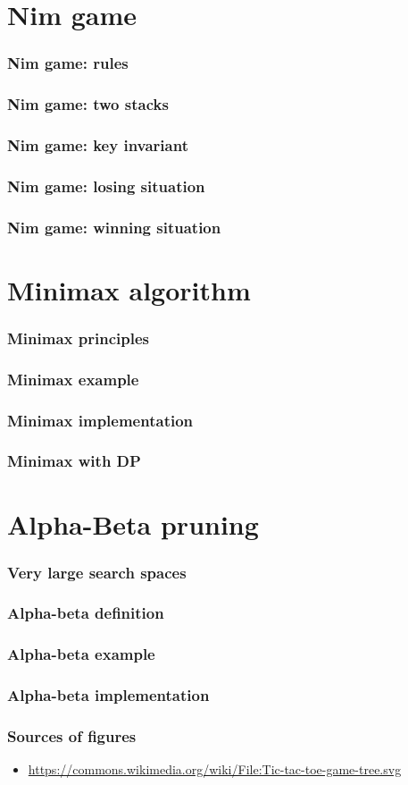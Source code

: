 \documentclass[12pt]{beamer}
\begin{document}
\section{Nim game}

\begin{frame}
\frametitle{Nim game: rules}
\end{frame}

\begin{frame}
\frametitle{Nim game: two stacks}
\end{frame}

\begin{frame}
\frametitle{Nim game: key invariant}
\end{frame}

\begin{frame}
\frametitle{Nim game: losing situation}
\end{frame}

\begin{frame}
\frametitle{Nim game: winning situation}
\end{frame}


\section{Minimax algorithm}
\begin{frame}
\frametitle{Minimax principles}
\end{frame}

\begin{frame}
\frametitle{Minimax example}
\end{frame}

\begin{frame}
\frametitle{Minimax implementation}
\end{frame}

\begin{frame}
\frametitle{Minimax with DP}
\end{frame}

\section{Alpha-Beta pruning}
\begin{frame}
\frametitle{Very large search spaces}
\end{frame}

\begin{frame}
\frametitle{Alpha-beta definition}
\end{frame}

\begin{frame}
\frametitle{Alpha-beta example}
\end{frame}

\begin{frame}
\frametitle{Alpha-beta implementation}
\end{frame}

\begin{frame}
\frametitle{Sources of figures}
\begin{itemize}
\item \url{https://commons.wikimedia.org/wiki/File:Tic-tac-toe-game-tree.svg}
\end{itemize}
\end{frame}
\end{document}
